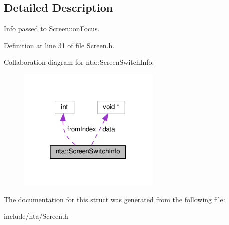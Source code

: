 \subsection{Detailed Description}
Info passed to \hyperlink{classnta_1_1Screen_a895548cdf2a5170d671983fc9189579a}{Screen\+::on\+Focus}. 

Definition at line 31 of file Screen.\+h.



Collaboration diagram for nta\+:\+:Screen\+Switch\+Info\+:\nopagebreak
\begin{figure}[H]
\begin{center}
\leavevmode
\includegraphics[width=193pt]{d3/d86/structnta_1_1ScreenSwitchInfo__coll__graph}
\end{center}
\end{figure}


The documentation for this struct was generated from the following file\+:\begin{DoxyCompactItemize}
\item 
include/nta/Screen.\+h\end{DoxyCompactItemize}
